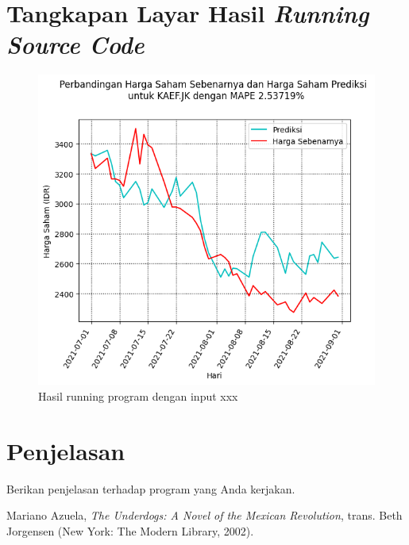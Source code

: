 \documentclass[english,12pt,a4paper,final]{article}
\begin{document}
\section{Tangkapan Layar Hasil \textit{Running Source Code}}
\begin{figure}
	\centering
	\includegraphics[width=\linewidth]{KAEF}
	\caption{Hasil running program dengan input xxx}
	\label{fig:kaef}
\end{figure}

\section{Penjelasan}
Berikan penjelasan terhadap program yang Anda kerjakan.

\begin{thebibliography}{9} 
	 Mariano Azuela, \textit{The Underdogs: A Novel of the Mexican Revolution}, trans. Beth Jorgensen (New York: The Modern Library, 2002). 
\end{thebibliography}
\end{document}
